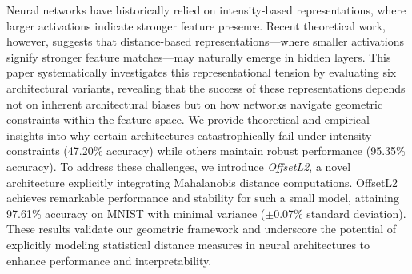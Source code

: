 Neural networks have historically relied on intensity-based representations, where larger activations indicate stronger feature presence. Recent theoretical work, however, suggests that distance-based representations—where smaller activations signify stronger feature matches—may naturally emerge in hidden layers. This paper systematically investigates this representational tension by evaluating six architectural variants, revealing that the success of these representations depends not on inherent architectural biases but on how networks navigate geometric constraints within the feature space. We provide theoretical and empirical insights into why certain architectures catastrophically fail under intensity constraints (47.20\% accuracy) while others maintain robust performance (95.35\% accuracy). To address these challenges, we introduce \textit{OffsetL2}, a novel architecture explicitly integrating Mahalanobis distance computations. OffsetL2 achieves remarkable performance and stability for such a small model, attaining 97.61\% accuracy on MNIST with minimal variance ($\pm$0.07\% standard deviation). These results validate our geometric framework and underscore the potential of explicitly modeling statistical distance measures in neural architectures to enhance performance and interpretability.
